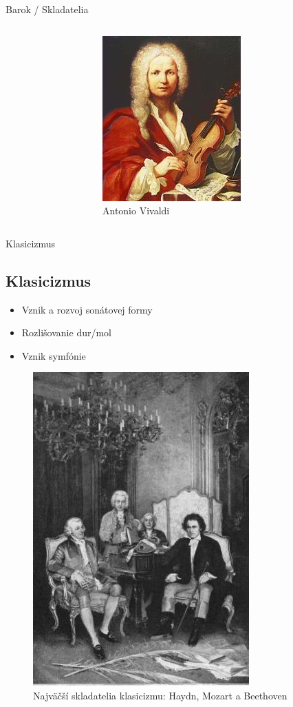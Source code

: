 \documentclass[dvipsnames]{beamer}
\begin{document}
\begin{frame}{\small \textcolor{g}{Barok} / \Large Skladatelia}
\begin{columns}
\begin{figure}
		\end{figure}%
		\begin{figure}
			\includegraphics[scale=1.75]{vivaldi}
			\caption{Antonio Vivaldi}
		\end{figure}

	\end{columns}
\end{frame}
\begin{frame}{Klasicizmus}
	\subsection{Klasicizmus}
	\begin{itemize}
		\item Vznik a rozvoj sonátovej formy
		\item Rozlišovanie dur/mol
		\item Vznik symfónie

	\end{itemize}
	\begin{figure}
		\includegraphics[scale=0.3]{klasmu}
		\caption{Najväčší skladatelia klasicizmu: Haydn, Mozart a Beethoven}
	\end{figure}
\end{frame}
\end{document}
